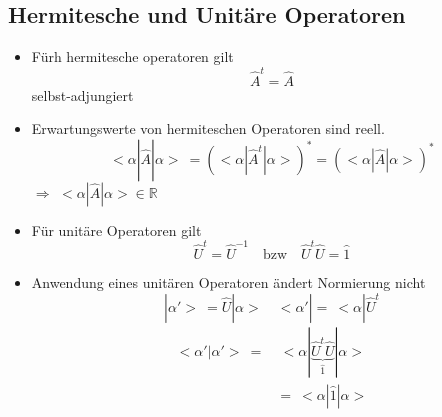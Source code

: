 \documentclass[10pt,article,colorback,accentcolor=tud9d]{scrartcl}
\begin{document}
\begin{fleqn}
\subsection{Hermitesche und Unitäre Operatoren}
\begin{itemize}
  \item Fürh hermitesche operatoren gilt
    \begin{equation}
    \hat{A}^t=\hat{A}
    \end{equation}
    selbst-adjungiert
  \item Erwartungswerte von hermiteschen Operatoren sind reell.
    \begin{equation}
    <\alpha\left.\right|\hat{A}\left.\right|\alpha> \ =  \left(<\alpha \left.\right| \hat{A}^t \left.\right| \alpha >\right)^* = \left(<\alpha \left.\right|\hat{A}\left.\right|\alpha>\right)^*
    \end{equation}
    $\Rightarrow$ $<\alpha\left.\right|\hat{A}\left.\right|\alpha> \in \mathbb{R}$
  \item Für unitäre Operatoren gilt
    \begin{equation}
    \hat{U}^t=\hat{U}^{-1} \quad \text{bzw} \quad \hat{U}^t\hat{U}=\hat{1}
    \end{equation}
  \item Anwendung eines unitären Operatoren ändert Normierung nicht
    \begin{equation} \nonumber
     \left.\right|\alpha'> \ = \hat{U}\left.\right|\alpha> \quad <\alpha'\left.\right|= \ <\alpha\left.\right|\hat{U}^t
    \end{equation}
    \begin{equation}
    \begin{aligned}
    <\alpha'\left.\right|\alpha'> \ =& \ <\alpha\left.\right|\underbrace{\hat{U}^t\hat{U}}_{\hat{1}}\left.\right|\alpha>\\
    &= \ <\alpha\left.\right|\hat{1}\left.\right|\alpha>
    \end{aligned}
    \end{equation}
    \end{itemize}

\end{fleqn}
\end{document}
